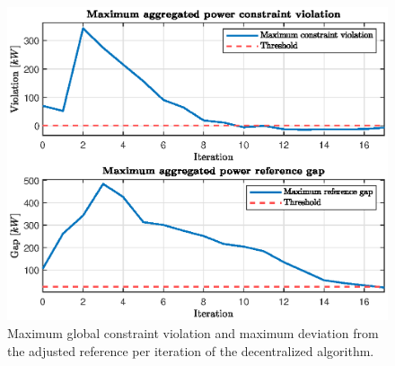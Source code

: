 \begin{figure}[H]
    \centering
    \includegraphics[width=\columnwidth]{figures/images/stop_criterion.eps}
    \caption{Maximum global constraint violation and maximum deviation from the adjusted reference per iteration of the decentralized algorithm.}
    \label{fig:dec_stop_criterion}
\end{figure}
